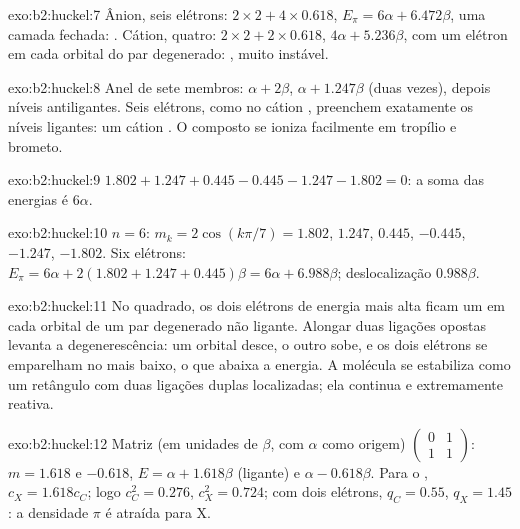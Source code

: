 \begin{solution}{exo:b2:huckel:7}
Ânion, seis elétrons: $2 \times 2 + 4 \times 0.618$, $E_\pi = 6\alpha + 6.472\beta$, uma camada
fechada: . Cátion, quatro: $2 \times 2 + 2 \times 0.618$, $4\alpha + 5.236\beta$, com um
elétron em cada orbital do par degenerado: , muito instável.
\end{solution}

\begin{solution}{exo:b2:huckel:8}
Anel de sete membros: $\alpha + 2\beta$, $\alpha + 1.247\beta$ (duas vezes), depois níveis
antiligantes. Seis elétrons, como no cátion , preenchem exatamente os
níveis ligantes: um cátion . O composto se ioniza facilmente em
tropílio e brometo.
\end{solution}

\begin{solution}{exo:b2:huckel:9}
$1.802 + 1.247 + 0.445 - 0.445 - 1.247 - 1.802 = 0$: a soma das energias é $6\alpha$.
\end{solution}

\begin{solution}{exo:b2:huckel:10}
$n = 6$: $m_k = 2\cos(k\pi/7) = 1.802$, $1.247$, $0.445$, $-0.445$, $-1.247$, $-1.802$. Six
elétrons: $E_\pi = 6\alpha + 2(1.802 + 1.247 + 0.445)\beta = 6\alpha + 6.988\beta$;
deslocalização $0.988\beta$.
\end{solution}

\begin{solution}{exo:b2:huckel:11}
No quadrado, os dois elétrons de energia mais alta ficam um em cada orbital de
um par degenerado não ligante. Alongar duas ligações opostas levanta a
degenerescência: um orbital desce, o outro sobe, e os dois elétrons se
emparelham no mais baixo, o que abaixa a energia. A molécula se estabiliza
como um retângulo com duas ligações duplas localizadas; ela continua
 e extremamente reativa.
\end{solution}

\begin{solution}{exo:b2:huckel:12}
Matriz (em unidades de $\beta$, com $\alpha$ como origem) $\begin{pmatrix}0 & 1\\ 1 & 1\end{pmatrix}$:
$m = 1.618$ e $-0.618$, $E = \alpha + 1.618\beta$ (ligante) e $\alpha - 0.618\beta$. Para o
, $c_X = 1.618c_C$; logo $c_C^2 = 0.276$, $c_X^2 = 0.724$; com dois
elétrons, $q_C = 0.55$, $q_X = 1.45$: a densidade $\pi$ é atraída para X.
\end{solution}

